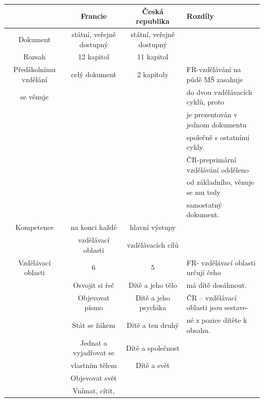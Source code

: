 \begin{landscape}
\begin{table}[t]
\center
\begin{tabular}{|c|c|c|l|}
\rowcolor{grey}
\hline			
				& \textbf{Francie}			& \textbf{Česká republika}	& \textbf{Rozdíly} 	\\
\hline
\hline
\rowcolor{grey!10}
Dokument	& státní, veřejně dostupný		& státní, veřejně dostupný 	& 			\\	\rowcolor{grey!50}
Rozsah		& 12 kapitol	 				& 11 kapitol	&						\\  \rowcolor{grey!10}
Předškolnímu vzdělání	& celý dokument			& 2 kapitoly	& FR-vzdělávání na půdě MŠ  zasahuje 	\\ \rowcolor{grey!10}
se věnuje				&						&				& do dvou vzdělávacích cyklů, proto  	\\ \rowcolor{grey!10}
				&								& 				& je prezentován v jednom dokumentu  	\\ \rowcolor{grey!10}
				&								&				& společně s ostatními cykly.    		\\ \rowcolor{grey!10}
				&								&				& ČR-preprimární vzdělávání odděleno 	\\ \rowcolor{grey!10}
				&								&				& od základního, věnuje se mu tedy  	\\ \rowcolor{grey!10}
				&								&				& samostatný dokument.					\\ 
\rowcolor{grey!50}
Kompetence		& na konci každé 				& hlavní výstupy  	&		\\	\rowcolor{grey!50}
				& vzdělávací oblasti 			& vzdělávacích cílů & 		\\
\rowcolor{grey!10}
Vzdělávací oblasti	& 6							& 5 					& FR- vzdělávací oblasti určují čeho 	\\	
\rowcolor{grey!10}
					& Osvojit si řeč			& Dítě a jeho tělo		& má dítě dosáhnout.					\\
\rowcolor{grey!10}
					& Objevovat písmo 			& Dítě a jeho psychika	& ČR – vzdělávací oblasti jsou sestave- \\
\rowcolor{grey!10}
					& Stát se žákem				& Dítě a ten druhý	 	& né z pozice dítěte k obsahu. 			\\
\rowcolor{grey!10}
					& Jednat a vyjadřovat se 	& Dítě a společnost 	& 	 									\\
\rowcolor{grey!10}
					& vlastním tělem			& Dítě a svět			& 	 									\\
\rowcolor{grey!10}
					& Objevovat svět			& 			 			& 	\\	
\rowcolor{grey!10}
					& Vnímat, cítit, 			& 						& 	\\

\end{tabular}
\end{table}
\end{landscape}
